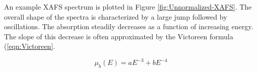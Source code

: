 


An example XAFS spectrum is plotted in Figure \ref{fig:Unnormalized-XAFS}. The overall shape of the spectra is characterized by a large jump followed by oscillations. The absorption steadily decreases as a function of increasing energy. The slope of this decrease is often approximated by the Victoreen formula (\ref{eqn:Victoreen}. 

\begin{equation}
    \label{eqn:Victoreen}
    \mu_b(E) = aE^{-3} + bE^{-4}
\end{equation}

